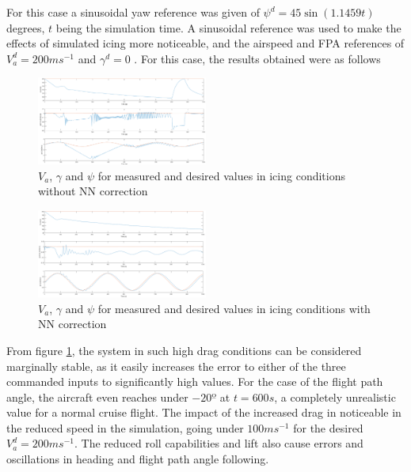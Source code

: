 For this case a sinusoidal yaw reference was given of $\psi^d= 45 \sin (1.1459t)$ degrees, $t$ being the simulation time. A sinusoidal reference was used to make the effects of simulated icing more noticeable, and the airspeed and FPA references of $V_a^d=200ms^{-1}$ and $\gamma^d=0$ . For this case, the results obtained were as follows

\begin{figure}[h]
\centering
\includegraphics[width=0.5\textwidth]{../Figures/Results/ref_icing.PNG}
\caption[Reference following in icing conditions]{$V_a$, $\gamma$ and $\psi$ for measured and desired values in icing conditions without NN correction}
\label{fig:ref_icing}
\end{figure}

\begin{figure}[h]
\centering
\includegraphics[width=0.5\textwidth]{../Figures/Results/ref_icing_NN.PNG}
\caption[Reference following in icing conditions with NN correction]{$V_a$, $\gamma$ and $\psi$ for measured and desired values in icing conditions with NN correction}
\label{fig:ref_icing_NN}
\end{figure}

From figure \ref{fig:ref_icing}, the system in such high drag conditions can be considered marginally stable, as it easily increases the error to either of the three commanded inputs to significantly high values. For the case of the flight path angle, the aircraft even reaches under $-20º$ at $t=600s$, a completely unrealistic value for a normal cruise flight. The impact of the increased drag in noticeable in the reduced speed in the simulation, going under $100ms^{-1}$ for the desired $V_a^d=200ms^{-1}$. The reduced roll capabilities and lift also cause errors and oscillations in heading and flight path angle following.

